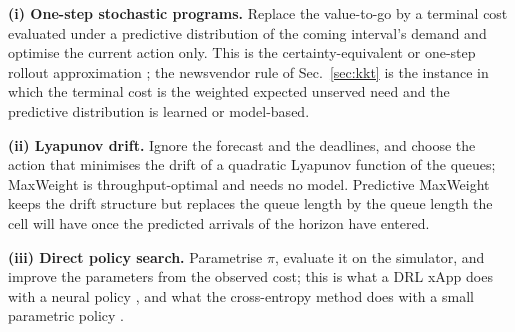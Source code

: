 \documentclass[journal]{IEEEtran}
\begin{document}
\textbf{(i) One-step stochastic programs.} Replace the value-to-go by a terminal cost evaluated under a predictive distribution of the coming interval's demand and optimise the current action only. This is the certainty-equivalent or one-step rollout approximation \cite{bertsekas2020}; the newsvendor rule of Sec.~\ref{sec:kkt} is the instance in which the terminal cost is the weighted expected unserved need and the predictive distribution is learned or model-based.

\textbf{(ii) Lyapunov drift.} Ignore the forecast and the deadlines, and choose the action that minimises the drift of a quadratic Lyapunov function of the queues; MaxWeight \cite{tassiulas1992,neely2010} is throughput-optimal and needs no model. Predictive MaxWeight \cite{huang2016} keeps the drift structure but replaces the queue length by the queue length the cell will have once the predicted arrivals of the horizon have entered.

\textbf{(iii) Direct policy search.} Parametrise $\pi$, evaluate it on the simulator, and improve the parameters from the observed cost; this is what a DRL xApp does with a neural policy \cite{dai2025,dora2025}, and what the cross-entropy method does with a small parametric policy \cite{rubinstein1999}.
\end{document}
